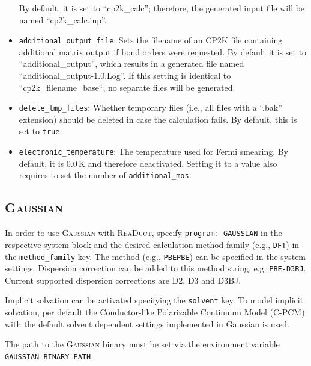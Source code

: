 \documentclass[]{tufte-book}
\begin{document}
\begin{itemize}
	By default, it is set to ``cp2k\_calc''; therefore, the generated input file will be named ``cp2k\_calc.inp''.
	\item \texttt{additional\_output\_file}: Sets the filename of an \textsc{CP2K} file containing additional matrix output if bond orders were requested.
	By default it is set to ``additional\_output'', which results in a generated file named ``additional\_output-1.0.Log''. If this setting is identical to ``cp2k\_filename\_base``, no separate files will be generated.
	\item \texttt{delete\_tmp\_files}: Whether temporary files (i.e., all files with a ``.bak'' extension) should be deleted in case
	the calculation fails. By default, this is set to \texttt{true}.
	\item \texttt{electronic\_temperature}: The temperature used for Fermi smearing. By default, it is 0.0\,K and therefore deactivated. Setting it to a value also requires to set the number of \texttt{additional\_mos}.
\end{itemize}

\subsection{\textsc{Gaussian}}

In order to use \textsc{Gaussian} with \textsc{ReaDuct}, specify \texttt{program: GAUSSIAN} in the respective system block and the desired
calculation method family (e.g., \texttt{DFT}) in the \texttt{method\_family} key.
The method (e.g., \texttt{PBEPBE}) can be specified in the system settings. Dispersion correction can be added to this method string, e.g: \texttt{PBE-D3BJ}. Current supported dispersion corrections are D2, D3\cite{grimmeD3} and D3BJ.\cite{bjDamping}

Implicit solvation can be activated specifying the \texttt{solvent} key.
To model implicit solvation, per default the Conductor-like Polarizable Continuum Model\cite{cpcm} (C-PCM) with the default solvent dependent settings implemented in Gaussian is used.

The path to the \textsc{Gaussian} binary must be set via the environment variable \texttt{GAUSSIAN\_BINARY\_PATH}.
\end{document}
